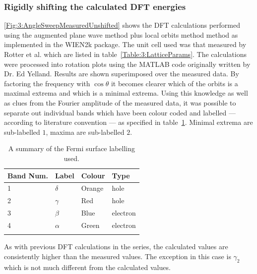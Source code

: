 \clearpage

\subsubsection{Rigidly shifting the calculated DFT energies}

\Fig\ref{Fig:3:AngleSweepMeasuredUnshifted} shows the DFT calculations performed using the augmented plane wave method plus local orbits method method as implemented in the WIEN2k package\cite{Blaha2001}. The unit cell used was that measured by Rotter et al. which are listed in table~\ref{Table:3:LatticeParams}. The calculations were processed into rotation plots using the MATLAB code originally written by Dr. Ed Yelland. Results are shown superimposed over the measured data. By factoring the frequency with $\cos{\theta}$ it becomes clearer which of the orbits is a maximal extrema and which is a minimal extrema. Using this knowledge as well as clues from the Fourier amplitude of the measured data, it was possible to separate out individual bands which have been colour coded and labelled --- according to literature convention --- as specified in table~\ref{Table:3:BandNaming}. Minimal extrema are sub-labelled $1$, maxima are sub-labelled $2$.
\begin{table}
    \begin{center}
        \caption{A summary of the Fermi surface labelling used.}
        \begin{tabular}[htbp]{llll}
\toprule
Band Num.  & Label & Colour    & Type \\
\midrule
1   & $\delta$  & Orange    & hole \\
2   & $\gamma$  & Red   & hole \\
3   & $\beta$   & Blue  & electron \\
4   & $\alpha$  & Green & electron \\
\bottomrule
        \label{Table:3:BandNaming}
        \end{tabular}
    \end{center}
\end{table}
As with previous DFT calculations in the \BaFePAs series, the calculated values are consistently higher than the measured values. The exception in this case is $\gamma_2$ which is not much different from the calculated values.
